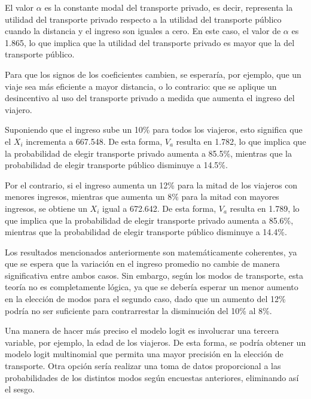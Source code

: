 El valor $\alpha$ es la constante modal del transporte privado, es decir, representa la utilidad del transporte privado respecto a la utilidad del transporte público cuando la distancia y el ingreso son iguales a cero. En este caso, el valor de $\alpha$ es 1.865, lo que implica que la utilidad del transporte privado es mayor que la del transporte público.

Para que los signos de los coeficientes cambien, se esperaría, por ejemplo, que un viaje sea más eficiente a mayor distancia, o lo contrario: que se aplique un desincentivo al uso del transporte privado a medida que aumenta el ingreso del viajero.

Suponiendo que el ingreso sube un 10\% para todos los viajeros, esto significa que el $X_i$ incrementa a 667.548. De esta forma, $V_a$ resulta en 1.782, lo que implica que la probabilidad de elegir transporte privado aumenta a 85.5\%, mientras que la probabilidad de elegir transporte público disminuye a 14.5\%.

Por el contrario, si el ingreso aumenta un 12\% para la mitad de los viajeros con menores ingresos, mientras que aumenta un 8\% para la mitad con mayores ingresos, se obtiene un $X_i$ igual a 672.642. De esta forma, $V_a$ resulta en 1.789, lo que implica que la probabilidad de elegir transporte privado aumenta a 85.6\%, mientras que la probabilidad de elegir transporte público disminuye a 14.4\%.

Los resultados mencionados anteriormente son matemáticamente coherentes, ya que se espera que la variación en el ingreso promedio no cambie de manera significativa entre ambos casos. Sin embargo, según los modos de transporte, esta teoría no es completamente lógica, ya que se debería esperar un menor aumento en la elección de modos para el segundo caso, dado que un aumento del 12\% podría no ser suficiente para contrarrestar la disminución del 10\% al 8\%.

Una manera de hacer más preciso el modelo logit es involucrar una tercera variable, por ejemplo, la edad de los viajeros. De esta forma, se podría obtener un modelo logit multinomial que permita una mayor precisión en la elección de transporte. Otra opción sería realizar una toma de datos proporcional a las probabilidades de los distintos modos según encuestas anteriores, eliminando así el sesgo.
